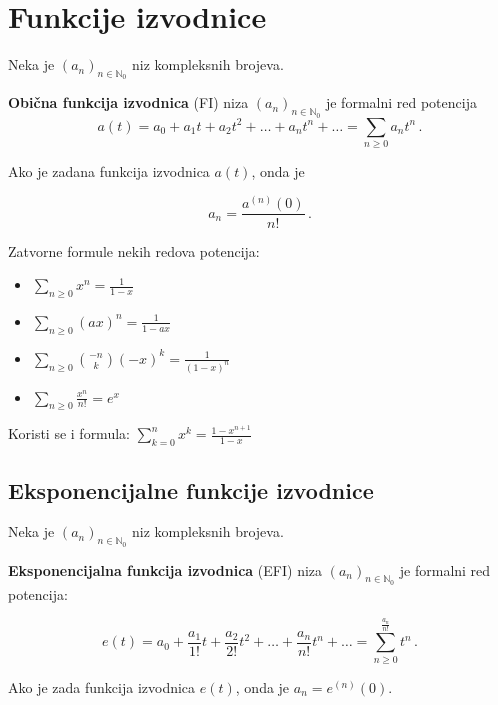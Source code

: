 \section{Funkcije izvodnice}

Neka je $(a_n)_{n\in\mathbb{N}_0}$ niz kompleksnih brojeva.

\textbf{Obična funkcija izvodnica} (FI) niza $(a_n)_{n\in\mathbb{N}_0}$ je formalni red potencija
$$
    a(t) = a_0 + a_1t+a_2t^2 + \dots + a_nt^n+\dots = \sum_{n \geq 0} a_nt^n\,.
$$

Ako je zadana funkcija izvodnica $a(t)$, onda je

$$
a_n = \frac{a^{(n)}(0)}{n!}\,.
$$

Zatvorne formule nekih redova potencija:

\begin{itemize}
    \item $\sum_{n\geq 0} x^n = \frac{1}{1-x}$
    \item $\sum_{n\geq 0} (ax)^n = \frac{1}{1-ax}$
    \item $\sum_{n\geq 0} \binom{-n}{k}(-x)^k = \frac{1}{(1-x)^n}$
    \item $\sum_{n\geq 0} \frac{x^n}{n!} = e^x$
\end{itemize}

Koristi se i formula: $\sum_{k=0}^{n}x^k = \frac{1-x^{n+1}}{1-x}$

\subsection{Eksponencijalne funkcije izvodnice}

Neka je $(a_n)_{n \in \mathbb{N}_0}$ niz kompleksnih brojeva.

\textbf{Eksponencijalna funkcija izvodnica} (EFI) niza $(a_n)_{n \in \mathbb{N}_0}$ je formalni red potencija:

$$
e(t) = a_0+\frac{a_1}{1!}t + \frac{a_2}{2!}t^2 + \dots + \frac{a_n}{n!}t^n + \dots = \sum_{n\geq 0}^ \frac{a_n}{n!}t^n\,.
$$

Ako je zada funkcija izvodnica $e(t)$, onda je $a_n = e^{(n)}(0)$.

